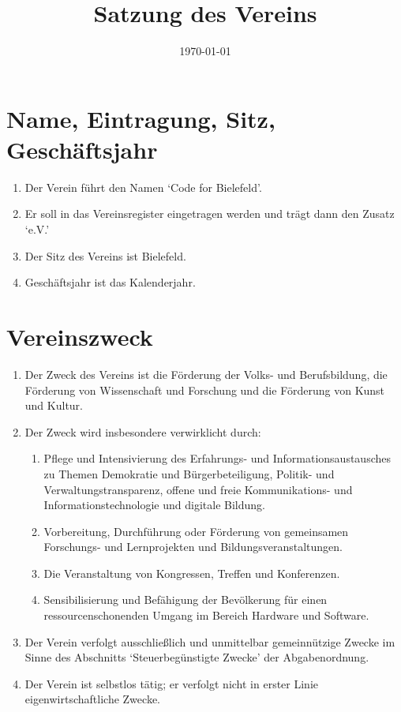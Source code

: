 \documentclass[12pt,a4paper,draft]{article}
\title{Satzung des Vereins \unsername} %
\author{\unsername}
\date{\today}
\newcommand{\unsername}{Code for Bielefeld}
\begin{document}
\maketitle
\tableofcontents

\section{Name, Eintragung, Sitz, Geschäftsjahr}
\begin{enumerate}
\item Der Verein führt den Namen `\unsername'.

\item Er soll in das Vereinsregister eingetragen werden und trägt dann den 
Zusatz `e.V.'

\item Der Sitz des Vereins ist Bielefeld. %

\item Geschäftsjahr ist das Kalenderjahr.
\end{enumerate}

\section{Vereinszweck} %
\begin{enumerate}
\item Der Zweck des Vereins ist die Förderung der Volks- und Berufsbildung, die 
Förderung von Wissenschaft und Forschung und die Förderung von Kunst und 
Kultur. %

\item Der Zweck wird insbesondere verwirklicht durch:

\begin{enumerate}
\item Pflege und Intensivierung des Erfahrungs- und Informationsaustausches zu 
Themen Demokratie und Bürgerbeteiligung, Politik- und Verwaltungstransparenz, 
offene und freie Kommunikations- und Informationstechnologie und digitale 
Bildung.

\item Vorbereitung, Durchführung oder Förderung von gemeinsamen Forschungs- und 
Lernprojekten und Bildungsveranstaltungen.

\item Die Veranstaltung von Kongressen, Treffen und Konferenzen.

\item Sensibilisierung und Befähigung der Bevölkerung für einen ressourcenschonenden Umgang im Bereich Hardware und Software.

\end{enumerate}

\item Der Verein verfolgt ausschließlich und unmittelbar gemeinnützige Zwecke 
im Sinne des Abschnitts `Steuerbegünstigte Zwecke' der Abgabenordnung.

\item Der Verein ist selbstlos tätig; er verfolgt nicht in erster Linie 
eigenwirtschaftliche Zwecke.
\end{enumerate}
\end{document}
